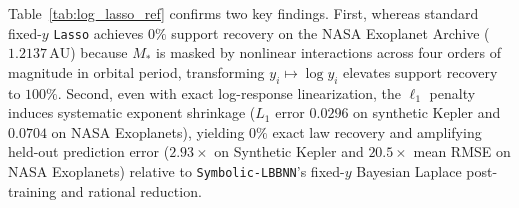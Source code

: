 \documentclass[11pt,a4paper]{article}
\begin{document}
Table~\ref{tab:log_lasso_ref} confirms two key findings. First, whereas standard fixed-$y$ \texttt{Lasso} achieves $0\%$ support recovery on the NASA Exoplanet Archive ($1.2137\,\text{AU}$) because $M_*$ is masked by nonlinear interactions across four orders of magnitude in orbital period, transforming $y_i \mapsto \log y_i$ elevates support recovery to $100\%$. Second, even with exact log-response linearization, the $\ell_1$ penalty induces systematic exponent shrinkage ($L_1$ error $0.0296$ on synthetic Kepler and $0.0704$ on NASA Exoplanets), yielding $0\%$ exact law recovery and amplifying held-out prediction error ($2.93\times$ on Synthetic Kepler and $20.5\times$ mean RMSE on NASA Exoplanets) relative to \texttt{Symbolic-LBBNN}'s fixed-$y$ Bayesian Laplace post-training and rational reduction.


\clearpage
\end{document}
